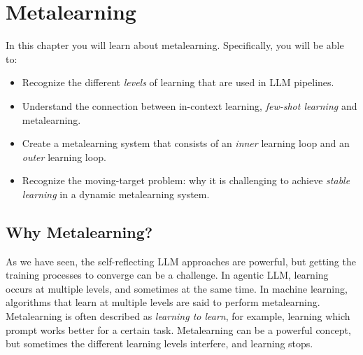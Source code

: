 

\chapter{Metalearning}\label{chap:meta}

\begin{learningbox}
In this chapter you will learn about  metalearning. 
Specifically, you will be able to:
\begin{itemize}[leftmargin=*, nosep]
    \item Recognize the different {\em levels} of learning that are used in LLM pipelines. 

 \item Understand the connection between in-context learning, {\em few-shot learning} and metalearning.

    \item Create a metalearning system that consists of an {\em inner} learning loop and an {\em outer} learning loop.
      
    \item Recognize the moving-target problem: why it is challenging to achieve {\em stable learning} in a dynamic metalearning system.

\end{itemize}
\end{learningbox}





\section{Why Metalearning?}
As we have seen, the self-reflecting LLM approaches are powerful, but getting the  training processes to converge can be a challenge. In agentic LLM, learning occurs at multiple levels, and sometimes at the same time. In machine learning, algorithms that learn at multiple levels are said to perform metalearning. Metalearning is often described as {\em learning to learn}, for example, learning which prompt works better for a certain task. Metalearning can be a powerful concept, but sometimes the different learning levels interfere, and learning stops.

